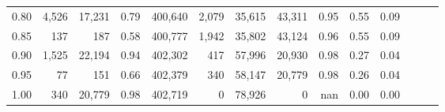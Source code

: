 \begin{tabular}{rrrrrrrrrrrrrr}
0.80 &   4,526 &  17,231 &  0.79 &  400,640 &    2,079 &  35,615 &  43,311 &  0.95 &  0.55 &      0.09 \\
0.85 &     137 &     187 &  0.58 &  400,777 &    1,942 &  35,802 &  43,124 &  0.96 &  0.55 &      0.09 \\
0.90 &   1,525 &  22,194 &  0.94 &  402,302 &      417 &  57,996 &  20,930 &  0.98 &  0.27 &      0.04 \\
0.95 &      77 &     151 &  0.66 &  402,379 &      340 &  58,147 &  20,779 &  0.98 &  0.26 &      0.04 \\
1.00 &     340 &  20,779 &  0.98 &  402,719 &        0 &  78,926 &       0 &   nan &  0.00 &      0.00 \\
\bottomrule
\end{tabular}
